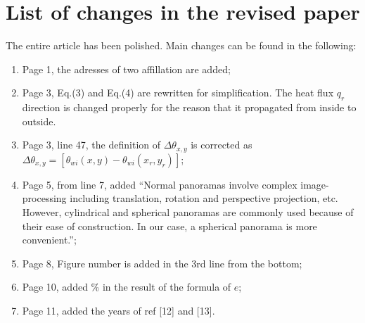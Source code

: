 \documentclass{article}
\begin{document}
\section{List of changes in the revised paper} %
The entire article has been polished. Main changes can be found in the following:
\begin{enumerate}
    \item Page 1, the adresses of two affillation are added; 
    \item Page 3, Eq.(3) and Eq.(4) are rewritten for simplification. The heat flux $q_r$ direction is changed properly for the reason that it propagated from inside to outside.
    \item Page 3, line 47, the definition of $\Delta \theta_{x,y}$ is corrected as $\Delta \theta_{x,y}=[\theta_{wi} (x,y)- \theta_{wi} (x_r,y_r)] $; 
    \item Page 5, from line 7, added ``Normal panoramas involve complex image-processing including translation, rotation and perspective projection, etc. However, cylindrical and spherical panoramas are commonly used because of their ease of construction. In our case, a spherical panorama is more convenient.”;
    \item Page 8, Figure number is added in the 3rd line from the bottom;
    \item Page 10, added \% in the result of the formula of $e$;
    \item Page 11, added the years of ref [12] and [13].
\end{enumerate}
\end{document}
